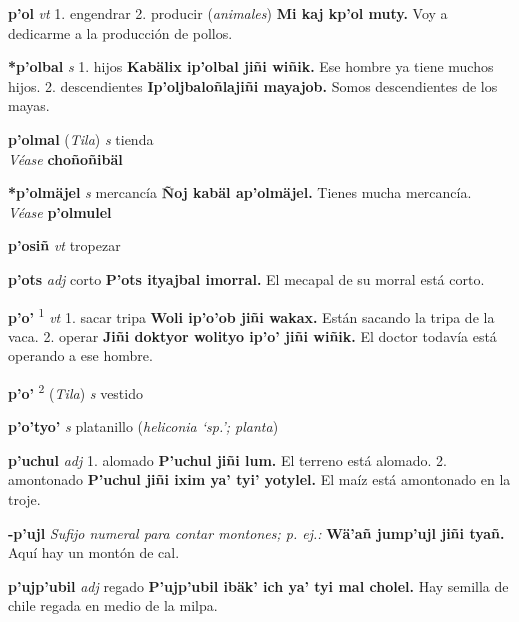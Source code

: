 \documentclass[10pt]{scrbook}
\newcommand{\entry}[1]{\textbf{#1}}
\newcommand{\onedefinition}[1]{#1.}
\newcommand{\defsuperscript}[1]{\textsuperscript{#1}}
\newcommand{\nontranslationdef}[1]{\textit{#1}}
\newcommand{\partofspeech}[1]{\textit{#1}}
\newcommand{\spanishtranslation}[1]{#1}
\newcommand{\clarification}[1]{(\textit{#1})}
\newcommand{\cholexample}[1]{\textbf{#1}}
\newcommand{\exampletranslation}[1]{#1}
\newcommand{\alsosee}[1]{\\\textit{Véase} \textbf{#1}}
\newcommand{\relevantdialect}[1]{(\textit{#1})}
\begin{document}
\begin{multicols}{2}
\entry{p'ol}
\partofspeech{vt}
\onedefinition{1}
\spanishtranslation{engendrar}
\onedefinition{2}
\spanishtranslation{producir}
\clarification{animales}
\cholexample{Mi kaj kp'ol muty.}
\exampletranslation{Voy a dedicarme a la producción de pollos.}

\entry{*p'olbal}
\partofspeech{s}
\onedefinition{1}
\spanishtranslation{hijos}
\cholexample{Kabälix ip'olbal jiñi wiñik.}
\exampletranslation{Ese hombre ya tiene muchos hijos.}
\onedefinition{2}
\spanishtranslation{descendientes}
\cholexample{Ip'oljbaloñlajiñi mayajob.}
\exampletranslation{Somos descendientes de los mayas.}

\entry{p'olmal}
\relevantdialect{Tila}
\partofspeech{s}
\spanishtranslation{tienda}
\alsosee{choñoñibäl}

\entry{*p'olmäjel}
\partofspeech{s}
\spanishtranslation{mercancía}
\cholexample{Ñoj kabäl ap'olmäjel.}
\exampletranslation{Tienes mucha mercancía.}
\alsosee{p'olmulel}

\entry{p'osiñ}
\partofspeech{vt}
\spanishtranslation{tropezar}

\entry{p'ots}
\partofspeech{adj}
\spanishtranslation{corto}
\cholexample{P'ots ityajbal imorral.}
\exampletranslation{El mecapal de su morral está corto.}

\entry{p'o'}
\defsuperscript{1}
\partofspeech{vt}
\onedefinition{1}
\spanishtranslation{sacar tripa}
\cholexample{Woli ip'o'ob jiñi wakax.}
\exampletranslation{Están sacando la tripa de la vaca.}
\onedefinition{2}
\spanishtranslation{operar}
\cholexample{Jiñi doktyor wolityo ip'o' jiñi wiñik.}
\exampletranslation{El doctor todavía está operando a ese hombre.}

\entry{p'o'}
\defsuperscript{2}
\relevantdialect{Tila}
\partofspeech{s}
\spanishtranslation{vestido}

\entry{p'o'tyo'}
\partofspeech{s}
\spanishtranslation{platanillo}
\clarification{heliconia ‘sp.’; planta}

\entry{p'uchul}
\partofspeech{adj}
\onedefinition{1}
\spanishtranslation{alomado}
\cholexample{P'uchul jiñi lum.}
\exampletranslation{El terreno está alomado.}
\onedefinition{2}
\spanishtranslation{amontonado}
\cholexample{P'uchul jiñi ixim ya' tyi' yotylel.}
\exampletranslation{El maíz está amontonado en la troje.}

\entry{-p'ujl}
\nontranslationdef{Sufijo numeral para contar montones; p. ej.:}
\cholexample{Wä'añ jump'ujl jiñi tyañ.}
\exampletranslation{Aquí hay un montón de cal.}

\entry{p'ujp'ubil}
\partofspeech{adj}
\spanishtranslation{regado}
\cholexample{P'ujp'ubil ibäk' ich ya' tyi mal cholel.}
\exampletranslation{Hay semilla de chile regada en medio de la milpa.}


\end{multicols}
\end{document}
